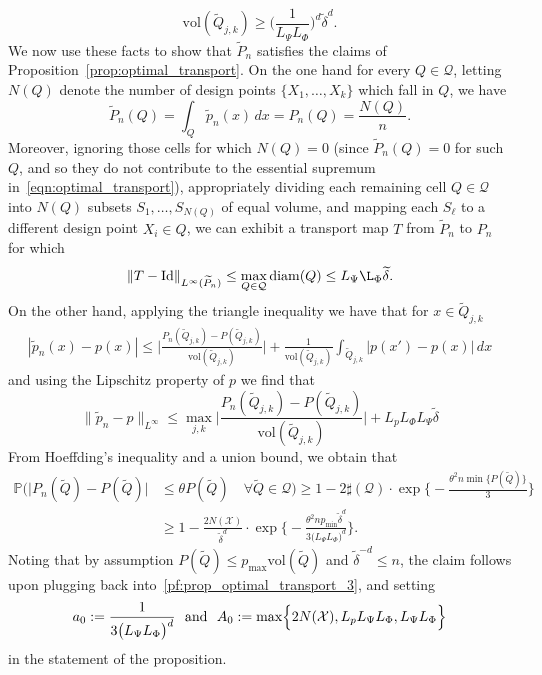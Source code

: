 \documentclass[twoside]{article}
\newcommand{\diam}{\mathrm{diam}}
\newcommand{\vol}{\text{vol}}
\newcommand{\1}{\mathbf{1}}
\newcommand{\Xset}{\mathcal{X}}
\newcommand{\Leb}{L}
\newcommand{\mc}[1]{\mathcal{#1}}
\newcommand{\wt}[1]{\widetilde{#1}}
\theoremstyle{definition}
\theoremstyle{remark}
\begin{document}
\begin{equation}
\label{pf:prop_optimal_transport_2}
\vol(\wt{Q}_{j,k}) \geq \biggl(\frac{1}{L_{\Psi} L_{\Phi}}\biggr)^d \wt{\delta}^d.
\end{equation}
We now use these facts to show that $\wt{P}_n$ satisfies the claims of Proposition~\ref{prop:optimal_transport}. On the one hand for every $Q \in \mc{Q}$, letting $N(Q)$ denote the number of design points $\{X_1,\ldots,X_k\}$ which fall in $Q$, we have
\begin{equation*}
\wt{P}_n(Q) = \int_{Q} \wt{p}_n(x) \,dx = P_n(Q) = \frac{N(Q)}{n}.
\end{equation*}
Moreover, ignoring those cells for which $N(Q) = 0$ (since $\wt{P}_n(Q) = 0$ for such $Q$, and so they do not contribute to the essential supremum in~\eqref{eqn:optimal_transport}), appropriately dividing each remaining cell $Q \in \mc{Q}$ into $N(Q)$ subsets $S_1,\ldots,S_{N(Q)}$ of equal volume, and mapping each $S_{\ell}$ to a different design point $X_i \in Q$, we can exhibit a transport map $T$ from $\wt{P}_n$ to $P_n$ for which
\begin{equation*}
\|T - \mathrm{Id}\|_{L^{\infty}(\wt{P}_n)} \leq \max_{Q \in \mc{Q}} \diam(Q) \leq   L_{\Psi} \L_{\Phi} \wt{\delta}.
\end{equation*}
On the other hand, applying the triangle inequality we have that for $x \in \wt{Q}_{j,k}$
\begin{align*}
|\wt{p}_n(x) - p(x)| \leq \biggl|\frac{P_n(\wt{Q}_{j,k}) - P(\wt{Q}_{j,k})}{\vol(\wt{Q}_{j,k})}\biggr| + \frac{1}{\vol(\wt{Q}_{j,k})} \int_{\wt{Q}_{j,k}} |p(x') - p(x)| \,dx 
\end{align*}
and using the Lipschitz property of $p$ we find that 
\begin{equation}
\label{pf:prop_optimal_transport_3}
\|\wt{p}_n - p\|_{\Leb^{\infty}} \leq \max_{j,k} \biggl|\frac{P_n(\wt{Q}_{j,k}) - P(\wt{Q}_{j,k})}{\vol(\wt{Q}_{j,k})}\biggr| + L_p L_{\Phi} L_{\Psi} \wt{\delta}
\end{equation}
From Hoeffding's inequality and a union bound, we obtain that 
\begin{align*}
\mathbb{P}\biggl( \bigl|P_n(\wt{Q}) - P(\wt{Q})\bigr| & \leq \theta P(\wt{Q}) \quad \forall \wt{Q} \in \mc{Q} \biggr) \geq 1 - 2 \sharp(\mc{Q}) \cdot \exp\biggl\{-\frac{\theta^2 n \min \{P(\wt{Q})\}}{3}\biggr\} \\
& \geq 1 - \frac{2 N(\Xset)}{\wt{\delta}^d} \cdot \exp\biggl\{-\frac{\theta^2 n p_{\min} \wt{\delta}^d }{3\bigl(L_{\Psi} L_{\Phi}\bigr)^d}\biggr\}.
\end{align*}
Noting that by assumption $P(\wt{Q}) \leq p_{\max} \vol(\wt{Q})$ and $\wt{\delta}^{-d} \leq n$, the claim follows upon plugging back into~\eqref{pf:prop_optimal_transport_3}, and setting
\begin{equation*}
a_0 := \frac{1}{3\bigl(L_{\Psi} L_{\Phi}\bigr)^d}~~\textrm{and}~~A_0 := \max \Bigl\{2N(\Xset),L_p L_{\Psi} L_{\Phi}, L_{\Psi} L_{\Phi}\Bigr\}
\end{equation*}
in the statement of the proposition.
\end{document}
